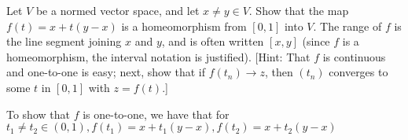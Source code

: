 \begin{exercise}{27}
    Let $V$ be a normed vector space, and let $x \neq y \in V$.
    Show that the map $f(t) = x + t(y - x)$ is a homeomorphism from $[0, 1]$ into $V$.
    The range of $f$ is the line segment joining $x$ and $y$, and is often written $[x, y]$ (since $f$ is a homeomorphism, the interval notation is justified).
    [Hint: That $f$ is continuous and one-to-one is easy; next, show that if $f(t_n) \rightarrow z$, then $(t_n)$ converges to some $t$ in $[0, 1]$ with $z = f(t)$.]
\end{exercise}

\begin{solution}
    
    To show that $f$ is one-to-one, we have that for $t_1 \neq t_2 \in (0, 1), f(t_1) = x + t_1(y - x), f(t_2) = x + t_2(y -x )$
\end{solution}
